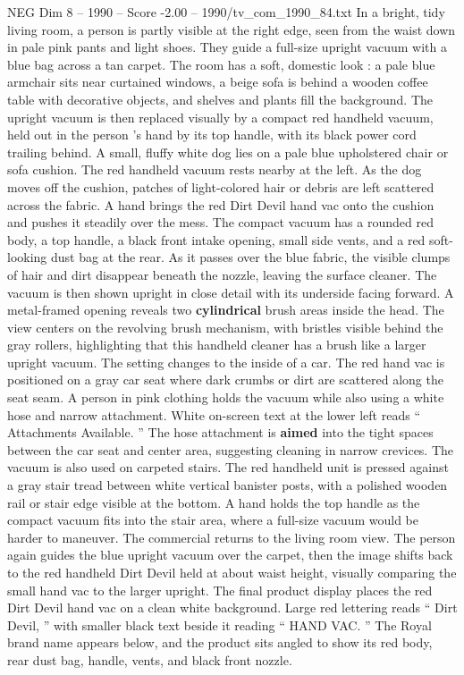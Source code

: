 \begin{textsample}{NEG Dim 8 – 1990 – Score -2.00 – 1990/tv\_com\_1990\_84.txt}  \label{ex:f8_neg_036}
In a bright, tidy living room, a person is partly visible at the right edge, seen from the waist down in pale pink pants and light shoes.
They guide a full-size upright vacuum with a blue bag across a tan carpet.
The room has a soft, domestic look : a pale blue armchair sits near curtained windows, a beige sofa is behind a wooden coffee table with decorative objects, and shelves and plants fill the background.
The upright vacuum is then replaced visually by a compact red handheld vacuum, held out in the person ’s hand by its top handle, with its black power cord trailing behind.
A small, fluffy white dog lies on a pale blue upholstered chair or sofa cushion.
The red handheld vacuum rests nearby at the left.
As the dog moves off the cushion, patches of light-colored hair or debris are left scattered across the fabric.
A hand brings the red Dirt Devil hand vac onto the cushion and pushes it steadily over the mess.
The compact vacuum has a rounded red body, a top handle, a black front intake opening, small side vents, and a red soft-looking dust bag at the rear.
As it passes over the blue fabric, the visible clumps of hair and dirt disappear beneath the nozzle, leaving the surface cleaner.
The vacuum is then shown upright in close detail with its underside facing forward.
A metal-framed opening reveals two \textbf{cylindrical} brush areas inside the head.
The view centers on the revolving brush mechanism, with bristles visible behind the gray rollers, highlighting that this handheld cleaner has a brush like a larger upright vacuum.
The setting changes to the inside of a car.
The red hand vac is positioned on a gray car seat where dark crumbs or dirt are scattered along the seat seam.
A person in pink clothing holds the vacuum while also using a white hose and narrow attachment.
White on-screen text at the lower left reads “ Attachments Available. ” The hose attachment is \textbf{aimed} into the tight spaces between the car seat and center area, suggesting cleaning in narrow crevices.
The vacuum is also used on carpeted stairs.
The red handheld unit is pressed against a gray stair tread between white vertical banister posts, with a polished wooden rail or stair edge visible at the bottom.
A hand holds the top handle as the compact vacuum fits into the stair area, where a full-size vacuum would be harder to maneuver.
The commercial returns to the living room view.
The person again guides the blue upright vacuum over the carpet, then the image shifts back to the red handheld Dirt Devil held at about waist height, visually comparing the small hand vac to the larger upright.
The final product display places the red Dirt Devil hand vac on a clean white background.
Large red lettering reads “ Dirt Devil, ” with smaller black text beside it reading “ HAND VAC. ” The Royal brand name appears below, and the product sits angled to show its red body, rear dust bag, handle, vents, and black front nozzle.

\end{textsample}
